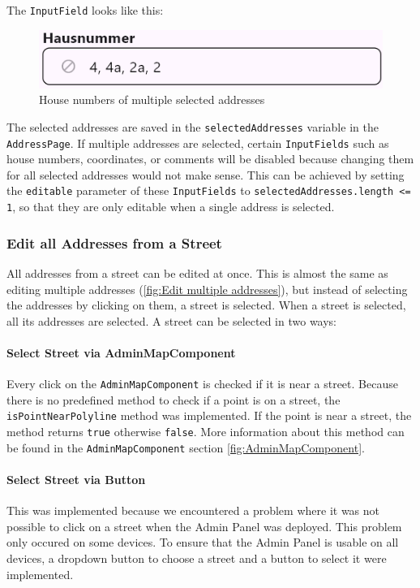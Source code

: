 The \texttt{InputField} looks like this:
\begin{figure}[H]
    \centering
    \includegraphics[width=0.6\linewidth]{images/AdminPanel/listedHouseNumbersInputField.png}
    \caption{House numbers of multiple selected addresses}
\end{figure}

The selected addresses are saved in the \texttt{selectedAddresses} variable in the \texttt{AddressPage}. If multiple addresses are selected, certain \texttt{InputFields} such as house numbers, coordinates, or comments will be disabled because changing them for all selected addresses would not make sense. This can be achieved by setting the \texttt{editable} parameter of these \texttt{InputFields} to \texttt{selectedAddresses.length <= 1}, so that they are only editable when a single address is selected.

\subsubsection{Edit all Addresses from a Street}
All addresses from a street can be edited at once. This is almost the same as editing multiple addresses (\ref{fig:Edit multiple addresses}), but instead of selecting the addresses by clicking on them, a street is selected. When a street is selected, all its addresses are selected. A street can be selected in two ways:

\paragraph{Select Street via AdminMapComponent}
Every click on the \texttt{AdminMapComponent} is checked if it is near a street. Because there is no predefined method to check if a point is on a street, the \texttt{isPointNearPolyline} method was implemented. If the point is near a street, the method returns \texttt{true} otherwise \texttt{false}. More information about this method can be found in the \texttt{AdminMapComponent} section \ref{fig:AdminMapComponent}.\\

\paragraph{Select Street via Button}
This was implemented because we encountered a problem where it was not possible to click on a street when the Admin Panel was deployed. This problem only occured on some devices. To ensure that the Admin Panel is usable on all devices, a dropdown button to choose a street and a button to select it were implemented.\\

